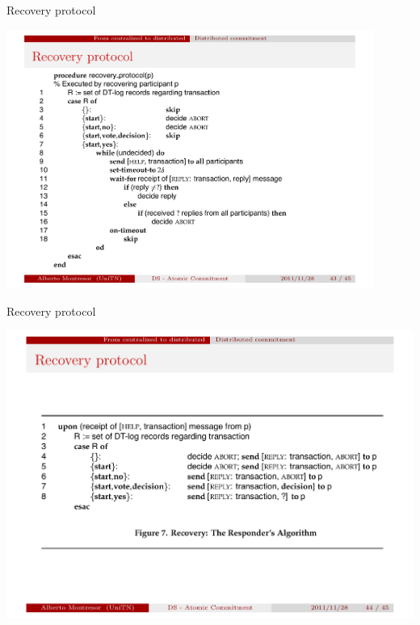 \begin{frame}{Recovery protocol}

\includegraphics[width=0.90\textwidth]{alg4.pdf}

\end{frame}

\begin{frame}{Recovery protocol}
	
\includegraphics[width=\textwidth]{alg5.pdf}
	
\end{frame}


\begin{RMFrame}

\BI
\item {}
\EI

\end{RMFrame}


